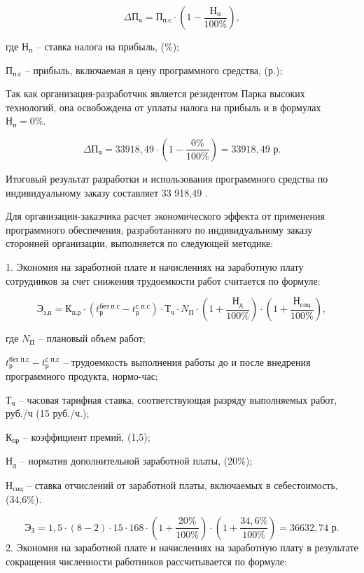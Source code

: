 $$
 \text{$\Delta$П}_{\text{ч}} = \text{П}_{\text{п.с}} \cdot (1 - \frac{\text{Н}_{\text{п}} }{100\%}),
$$

где $\text{Н}_{\text{п}}$ -- ставка налога на прибыль, (\%);

   $\text{П}_{\text{п.с}}$ -- прибыль, включаемая в цену программного средства, (р.);

Так как организация-разработчик является резидентом Парка высоких технологий, она освобождена от уплаты налога на прибыль и в формулах $\text{Н}_{\text{п}}=0\%$.

$$
 \text{$\Delta$П}_{\text{ч}} = 33918,49 \cdot (1 - \frac{0\%}{100\%}) = 33918,49 \text{ р}.
$$

Итоговый результат разработки и использования программного средства по индивидуальному заказу составляет 33 918,49 .

Для организации-заказчика расчет экономического эффекта от применения программного обеспечения, разработанного по индивидуальному заказу сторонней организации, выполняется по следующей методике:

1. Экономия на заработной плате и начислениях на заработную плату сотрудников за счет снижения трудоемкости работ считается по формуле:


\begin{equation}
    \text{Э}_{\text{з.п}} = \text{К}_{\text{п.р}}\cdot (t^{\text{без п.с}}_{\text{р}}-t^{\text{с п.с}}_{\text{р}})\cdot \text{Т}_{\text{ч}}\cdot N_{\text{П}}\cdot  (1+\frac{\text{Н}_{\text{д}}}{100\%})\cdot (1+\frac{\text{Н}_{\text{соц}}}{100\%}), 
\end{equation}

где $N_{\text{П}}$ -- плановый объем работ; 

    $t^{\text{без п.с}}_{\text{р}}-t^{\text{с п.с}}_{\text{р}}$ -- трудоемкость выполнения работы до и после внедрения программного продукта, нормо-час; 
    
    $\text{Т}_{\text{ч}}$ -- часовая тарифная ставка, соответствующая разряду выполняемых работ, руб./ч (15 руб./ч.); 
    
    $\text{К}_{\text{пр}}$ -- коэффициент премий, (1,5); 
    
    $\text{Н}_{\text{д}}$ -- норматив дополнительной заработной платы, (20\%); 
    
    $\text{Н}_{\text{соц}}$ -- ставка отчислений от заработной платы, включаемых в себестоимость, (34,6\%).
 
$$
    \text{Э}_{\text{З}} = 1,5 \cdot (8-2)\cdot 15\cdot 168 \cdot  (1+\frac{20\%}{100\%})\cdot (1+\frac{34,6\%}{100\%}) =  36632,74 \text{ р}.
$$
2. Экономия на заработной плате и начислениях на заработную плату в результате сокращения численности работников рассчитывается по формуле:

